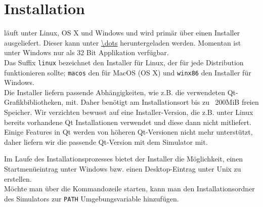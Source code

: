 
\section{Installation}

\erasim{} läuft unter Linux, OS X und Windows und wird primär über einen Installer ausgeliefert. Dieser kann unter \url{\dots} heruntergeladen werden. Momentan ist \erasim{} unter Windows nur als 32 Bit Applikation verfügbar.\\
Das Suffix \texttt{linux} bezeichnet den Installer für Linux, der für jede Distribution funktionieren sollte; \texttt{macos} den für MacOS (OS X) und \texttt{winx86} den Installer für Windows.\\
Die Installer liefern passende Abhängigkeiten, wie z.B. die verwendeten Qt-Grafikbibliotheken, mit. Daher benötigt \erasim{} am Installationsort bis zu ~200MiB freien Speicher. Wir verzichten bewusst auf eine Installer-Version, die z.B. unter Linux bereits vorhandene Qt Installationen verwendet und diese dann nicht mitliefert. Einige Features in Qt werden von höheren Qt-Versionen nicht mehr unterstützt, daher liefern wir die passende Qt-Version mit dem Simulator mit.

Im Laufe des Installationsprozesses bietet der Installer die Möglichkeit, einen Startmenüeintrag unter Windows bzw. einen Desktop-Eintrag unter Unix zu erstellen.\\
Möchte man \erasim{} über die Kommandozeile starten, kann man den Installationsordner des Simulators zur \texttt{PATH} Umgebungsvariable hinzufügen.